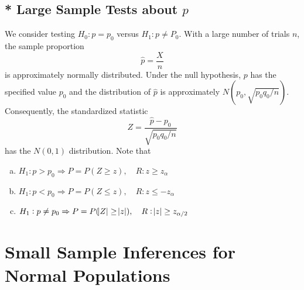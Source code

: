 \documentclass[12pt,a4paper]{article}
\begin{document}
\subsection*{* Large Sample Tests about $p$}
We consider testing $H_0:p=p_0$ versus $H_1:p\neq P_0$. With a large number of trials $n$, the sample proportion \[
\hat{p}=\frac{X}{n}
\] is approximately normally distributed. Under the null hypothesis, $p$ has the specified value $p_0$ and the distribution of $\hat{p}$ is approximately $N(p_0,\sqrt{p_0q_0/n})$. Consequently, the standardized statistic \[
Z=\frac{\hat{p}-p_0}{\sqrt{p_0q_0/n}}
\] has the $N(0,1)$ distribution. Note that \begin{enumerate}[(a)]
	\item $H_1:p>p_0\Rightarrow P=P(Z\geq z),\quad R:z\geq z_{\alpha}$
	\item $H_1:p<p_0\Rightarrow P=P(Z\leq z),\quad R:z\leq -z_{\alpha}$
	\item $H_1:p\neq p_0\Rightarrow P=P(\abs{Z}\geq \abs{z}),\quad R:\abs{z}\geq z_{\alpha/2}$
\end{enumerate}

\newpage
\section{Small Sample Inferences for Normal Populations}
\end{document}
